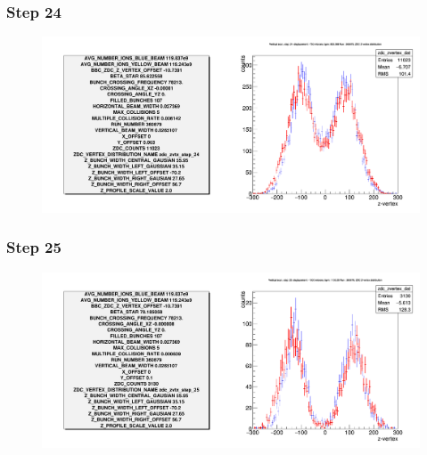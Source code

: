 \begin{frame}
  \frametitle{Step 24}
  \begin{figure}
    \includegraphics[width=\linewidth]{"./figures/tuned_simulation_step_24"}
    \label{fig:step_24}
  \end{figure}
\end{frame}

\begin{frame}
  \frametitle{Step 25}
  \begin{figure}
    \includegraphics[width=\linewidth]{"./figures/tuned_simulation_step_25"}
    \label{fig:step_25}
  \end{figure}
\end{frame}

